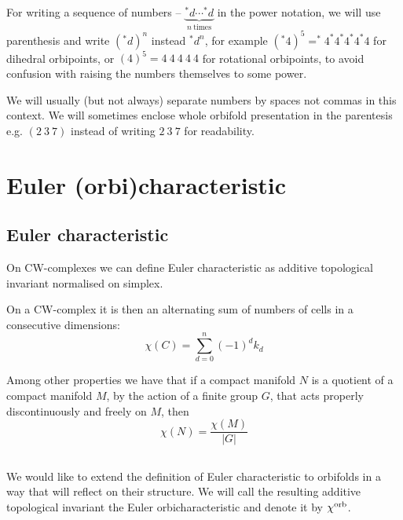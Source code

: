 For writing a sequence of numbers -- $\underbrace{^*d\cdots ^*d}_{n\ \mathrm{times}}$ 
in the power notation, we will use 
parenthesis and write $(^*d)^n$ instead $^*d^n$, for example 
$(^*4)^5 = ^*4^*4^*4^*4^*4$ for dihedral 
orbipoints, or $(4)^5 = 4\ 4\ 4\ 4\ 4$ for rotational orbipoints, to avoid confusion with 
raising the numbers themselves to some power. 

We will usually (but not always) 
separate numbers by spaces not commas in this context. 
We will sometimes enclose whole orbifold presentation in the parentesis e.g. $(2\ 3\ 7)$ instead 
of writing $2\ 3\ 7$ for readability.

\section{Euler (orbi)characteristic}\label{E_orb}
\label{\Eoc_as_a_sum}
\subsection{Euler characteristic}
On CW-complexes we can define Euler characteristic as additive topological invariant 
normalised on simplex.

On a CW-complex it is then an alternating sum of numbers of cells in 
a consecutive dimensions: 
\begin{equation}
\chi(C) = \sum_{d = 0}^n (-1)^d k_d
\end{equation}

Among other properties we have that if a compact manifold $N$ is a quotient of a compact 
manifold $M$, 
by the action of a finite group $G$, that acts properly discontinuously and freely on $M$, then
\begin{equation}
\chi(N) = \frac{\chi(M)}{|G|}
\end{equation}   


\subsection{\Eoc}\label{Eoc}\label{extended_Euler_orbicharacteristic}
We would like to extend the definition of Euler characteristic to orbifolds in a way 
that will reflect on their structure. 
We will call the resulting additive topological invariant the Euler orbicharacteristic 
and denote it by $\chi^{\rm orb}$.


